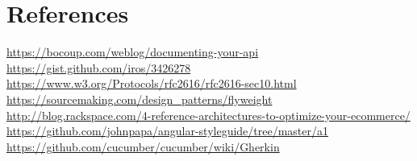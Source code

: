\documentclass{report}
\begin{document}
\chapter{References}
\url {https://bocoup.com/weblog/documenting-your-api}\\ 
\url {https://gist.github.com/iros/3426278}\\
\url {https://www.w3.org/Protocols/rfc2616/rfc2616-sec10.html} \\
\url {https://sourcemaking.com/design_patterns/flyweight} \\
\url {http://blog.rackspace.com/4-reference-architectures-to-optimize-your-ecommerce/} \\
\url {https://github.com/johnpapa/angular-styleguide/tree/master/a1} \\
\url {https://github.com/cucumber/cucumber/wiki/Gherkin} \\
\end{document}
